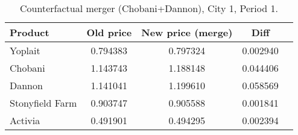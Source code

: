 \begin{table}[H]
\centering
\caption{Counterfactual merger (Chobani+Dannon), City 1, Period 1.}
\begin{tabular}{lcccc}
\toprule
Product & Old price & New price (merge) & Diff \\
\midrule
Yoplait & 0.794383 & 0.797324 & 0.002940 \\
Chobani & 1.143743 & 1.188148 & 0.044406 \\
Dannon & 1.141041 & 1.199610 & 0.058569 \\
Stonyfield Farm & 0.903747 & 0.905588 & 0.001841 \\
Activia & 0.491901 & 0.494295 & 0.002394 \\
\bottomrule
\end{tabular}
\label{tab:q16_merge_c1t1}
\end{table}
